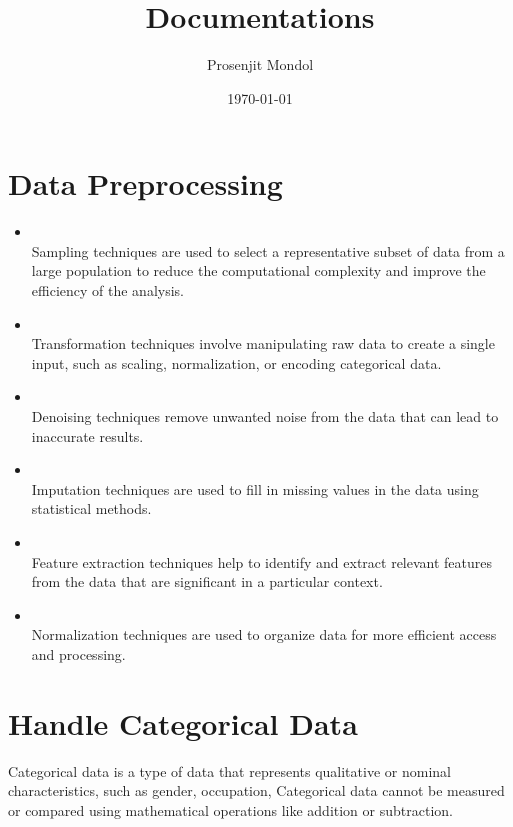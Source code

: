 \documentclass{article}
\title{Documentations}
\author{Prosenjit Mondol}
\date{\today}
\begin{document}
\maketitle

\newpage %

\section{Data Preprocessing}
\begin{itemize}
    \item \textbf{\textcolor{blue}{}}\\
        Sampling techniques are used to select a representative subset of data from a large population to reduce the computational complexity and improve the efficiency of the analysis.
    \item \textbf{\textcolor{blue}{}}\\
    Transformation techniques involve manipulating raw data to create a single input, such as scaling, normalization, or encoding categorical data.
    \item \textbf{\textcolor{blue}{}}\\
    Denoising techniques remove unwanted noise from the data that can lead to inaccurate results.
    \item \textbf{\textcolor{blue}{}}\\
    Imputation techniques are used to fill in missing values in the data using statistical methods.
    \item \textbf{\textcolor{blue}{}}\\
    Feature extraction techniques help to identify and extract relevant features from the data that are significant in a particular context.
    \item \textbf{\textcolor{blue}{}}\\
    Normalization techniques are used to organize data for more efficient access and processing.

\end{itemize}

\section{Handle Categorical Data}

Categorical data is a type of data that represents qualitative or nominal characteristics, such as gender, occupation, Categorical data cannot be measured or compared using mathematical operations like addition or subtraction.
\end{document}
